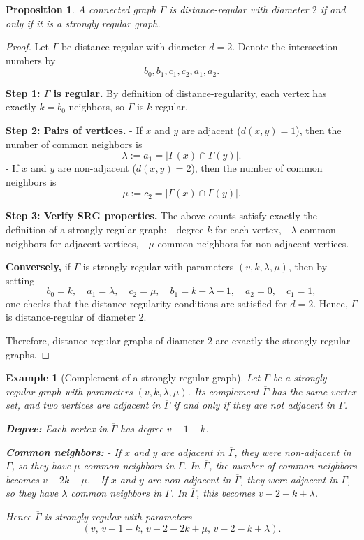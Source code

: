 \documentclass[12pt,a4paper,openany]{book}
\newtheorem{example}{Example}[section]
\newtheorem{proposition}{Proposition}[section]
\begin{document}
\begin{proposition}
A connected graph $\Gamma$ is distance-regular with diameter $2$ if and only if 
it is a strongly regular graph.
\end{proposition}

\begin{proof}
Let $\Gamma$ be distance-regular with diameter $d=2$. Denote the intersection numbers by
\[
b_0, b_1, c_1, c_2, a_1, a_2.
\]

\medskip\noindent
\textbf{Step 1: $\Gamma$ is regular.}  
By definition of distance-regularity, each vertex has exactly $k = b_0$ neighbors, so $\Gamma$ is $k$-regular.

\medskip\noindent
\textbf{Step 2: Pairs of vertices.}  
- If $x$ and $y$ are adjacent ($d(x,y)=1$), then the number of common neighbors is
\[
\lambda := a_1 = |\Gamma(x)\cap \Gamma(y)|.
\]  
- If $x$ and $y$ are non-adjacent ($d(x,y)=2$), then the number of common neighbors is
\[
\mu := c_2 = |\Gamma(x)\cap \Gamma(y)|.
\]  

\medskip\noindent
\textbf{Step 3: Verify SRG properties.}  
The above counts satisfy exactly the definition of a strongly regular graph:  
- degree $k$ for each vertex,  
- $\lambda$ common neighbors for adjacent vertices,  
- $\mu$ common neighbors for non-adjacent vertices.

\medskip\noindent
\textbf{Conversely,} if $\Gamma$ is strongly regular with parameters $(v,k,\lambda,\mu)$, then by setting
\[
b_0=k,\quad a_1=\lambda,\quad c_2=\mu,\quad b_1=k-\lambda-1,\quad a_2=0,\quad c_1=1,
\]
one checks that the distance-regularity conditions are satisfied for $d=2$. Hence, $\Gamma$ is distance-regular of diameter 2.

\medskip\noindent
Therefore, distance-regular graphs of diameter $2$ are exactly the strongly regular graphs.
\end{proof}



\begin{example}[Complement of a strongly regular graph]
Let $\Gamma$ be a strongly regular graph with parameters $(v,k,\lambda,\mu)$. 
Its complement $\overline{\Gamma}$ has the same vertex set, and two vertices
are adjacent in $\overline{\Gamma}$ if and only if they are not adjacent in $\Gamma$.

\medskip
\noindent
\textbf{Degree:} Each vertex in $\overline{\Gamma}$ has degree $v-1-k$.  

\textbf{Common neighbors:}  
- If $x$ and $y$ are adjacent in $\overline{\Gamma}$, they were non-adjacent in $\Gamma$, so they have $\mu$ common neighbors in $\Gamma$. In $\overline{\Gamma}$, the number of common neighbors becomes $v-2k+\mu$.  
- If $x$ and $y$ are non-adjacent in $\overline{\Gamma}$, they were adjacent in $\Gamma$, so they have $\lambda$ common neighbors in $\Gamma$. In $\overline{\Gamma}$, this becomes $v-2-k+\lambda$.  

Hence $\overline{\Gamma}$ is strongly regular with parameters
\[
(v,\,v-1-k,\,v-2-2k+\mu,\,v-2-k+\lambda).
\]
\end{example}
\end{document}
